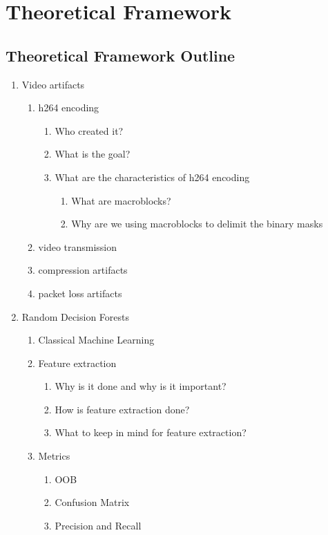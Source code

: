 \chapter{Theoretical Framework}
\label{ch:marco}

\section{Theoretical Framework Outline}

\begin{enumerate}
\item Video artifacts
  \begin{enumerate}
  \item h264 encoding
    \begin{enumerate}
    \item Who created it?
    \item What is the goal?
    \item What are the characteristics of h264 encoding
      \begin{enumerate}
      \item What are macroblocks?
      \item Why are we using macroblocks to delimit the binary masks
      \end{enumerate}
    \end{enumerate}
  \item video transmission
  \item compression artifacts
  \item packet loss artifacts
  \end{enumerate}
\item Random Decision Forests
  \begin{enumerate}
  \item Classical Machine Learning
  \item Feature extraction
    \begin{enumerate}
    \item Why is it done and why is it important?
    \item How is feature extraction done?
    \item What to keep in mind for feature extraction?
    \end{enumerate}
  \item Metrics
    \begin{enumerate}
    \item OOB
    \item Confusion Matrix
    \item Precision and Recall
    \end{enumerate}
  \end{enumerate}
\end{enumerate}

